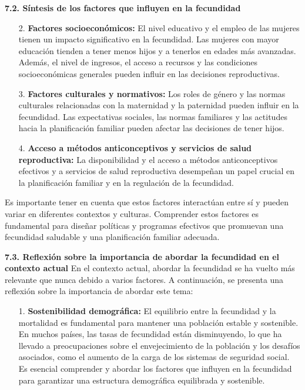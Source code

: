 \documentclass[8pt,a4paper]{beamer}
\begin{document}
{\begin{frame}{}
\begin{block}{\textbf{7.2. Síntesis de los factores que influyen en la fecundidad}}
\begin{enumerate}
\item[2.] \textbf{Factores socioeconómicos:} El nivel educativo y el empleo de las mujeres tienen un impacto significativo en la fecundidad. Las mujeres con mayor educación tienden a tener menos hijos y a tenerlos en edades más avanzadas. Además, el nivel de ingresos, el acceso a recursos y las condiciones socioeconómicas generales pueden influir en las decisiones reproductivas.

\item[3.] \textbf{Factores culturales y normativos:} Los roles de género y las normas culturales relacionadas con la maternidad y la paternidad pueden influir en la fecundidad. Las expectativas sociales, las normas familiares y las actitudes hacia la planificación familiar pueden afectar las decisiones de tener hijos.
\end{enumerate}
\end{block}
\end{frame}


\begin{frame}{}
\begin{block}{}
\setlength{\parskip}{3px}
\justifying
\begin{enumerate}
\setlength{\parskip}{3px}
\justifying
\item[4.] \textbf{Acceso a métodos anticonceptivos y servicios de salud reproductiva:} La disponibilidad y el acceso a métodos anticonceptivos efectivos y a servicios de salud reproductiva desempeñan un papel crucial en la planificación familiar y en la regulación de la fecundidad.
\end{enumerate}
Es importante tener en cuenta que estos factores interactúan entre sí y pueden variar en diferentes contextos y culturas. Comprender estos factores es fundamental para diseñar políticas y programas efectivos que promuevan una fecundidad saludable y una planificación familiar adecuada.
\end{block}
\end{frame}


\begin{frame}{}
\begin{block}{\textbf{7.3. Reflexión sobre la importancia de abordar la fecundidad en el contexto actual}}
\setlength{\parskip}{3px}
\justifying
En el contexto actual, abordar la fecundidad se ha vuelto más relevante que nunca debido a varios factores. A continuación, se presenta una reflexión sobre la importancia de abordar este tema:
\begin{enumerate}
\setlength{\parskip}{3px}
\justifying
\item[1.] \textbf{Sostenibilidad demográfica:} El equilibrio entre la fecundidad y la mortalidad es fundamental para mantener una población estable y sostenible. En muchos países, las tasas de fecundidad están disminuyendo, lo que ha llevado a preocupaciones sobre el envejecimiento de la población y los desafíos asociados, como el aumento de la carga de los sistemas de seguridad social. Es esencial comprender y abordar los factores que influyen en la fecundidad para garantizar una estructura demográfica equilibrada y sostenible.


\end{enumerate}
\end{block}
\end{frame}}
\end{document}
